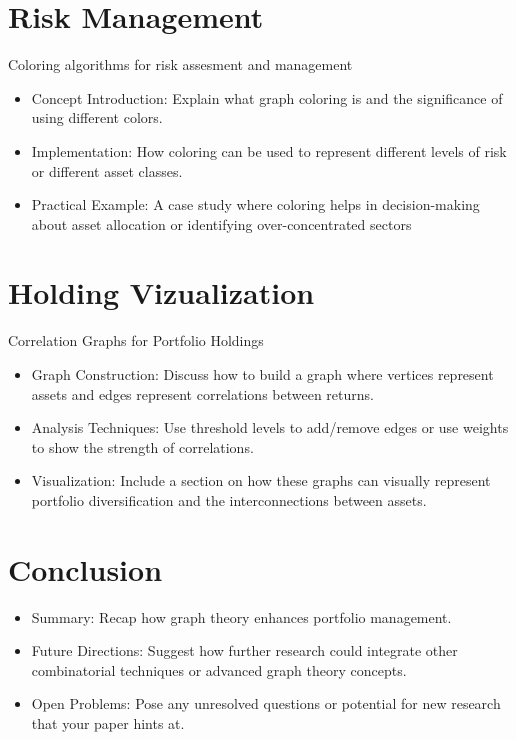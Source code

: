 \documentclass{article}
\begin{document}
\section{Risk Management}
Coloring algorithms for risk assesment and management

\begin{itemize}
    \item Concept Introduction: Explain what graph coloring is and the significance of using different colors.
    \item Implementation: How coloring can be used to represent different levels of risk or different asset classes.
    \item Practical Example: A case study where coloring helps in decision-making about asset allocation or identifying over-concentrated sectors
\end{itemize}


\section{Holding Vizualization}

Correlation Graphs for Portfolio Holdings

\begin{itemize}
    \item Graph Construction: Discuss how to build a graph where vertices represent assets and edges represent correlations between returns.
    \item Analysis Techniques: Use threshold levels to add/remove edges or use weights to show the strength of correlations.
    \item Visualization: Include a section on how these graphs can visually represent portfolio diversification and the interconnections between assets.
\end{itemize}


\section{Conclusion}

\begin{itemize}
    \item Summary: Recap how graph theory enhances portfolio management.
    \item Future Directions: Suggest how further research could integrate other combinatorial techniques or advanced graph theory concepts.
    \item Open Problems: Pose any unresolved questions or potential for new research that your paper hints at.
\end{itemize}
\end{document}
